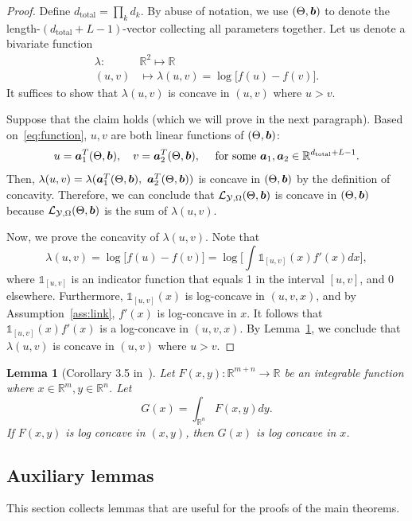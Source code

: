 \documentclass{article}
\theoremstyle{plain}
\newtheorem{lem}{Lemma}
\theoremstyle{definition}
\begin{document}
\begin{proof}
Define $d_{\text{total}}=\prod_k d_k$. By abuse of notation, we use $(\Theta,\bm{b})$ to denote the length-$(d_{\text{total}}+L-1)$-vector collecting all parameters together. Let us denote a bivariate function
\begin{align}
\lambda\colon &\mathbb{R}^2\mapsto \mathbb{R}\\
(u,v)&\mapsto\lambda(u,v) = \log \big[f(u)-  f(v)\big].
\end{align}
It suffices to show that $\lambda(u,v)$ is concave in $(u,v)$ where $u>v$.

Suppose that the claim holds (which we will prove in the next paragraph). Based on~\eqref{eq:function}, $u,v$ are both linear functions of $(\Theta,\bm{b})$:
\[
u = \bm{a}_1^T(\Theta,\bm{b}), \quad v = \bm{a}_2^T(\Theta,\bm{b}), \quad \text{ for some}\ \bm{a}_1,\bm{a}_2\in \mathbb{R}^{d_{\text{total}}+L-1}.
\]
Then, $\lambda(u,v) = \lambda(\ma_1^T(\Theta,\mb),\ \ma_2^T(\Theta,\mb))$ is concave in $(\Theta,\bm{b})$ by the definition of concavity. Therefore, we can conclude that $\mathcal{L}_{\mathcal{Y},\Omega}(\Theta, \bm{b}) $ is concave in $(\Theta,\bm{b})$ because $\mathcal{L}_{\mathcal{Y},\Omega}(\Theta, \bm{b})$ is the sum of $\lambda(u,v)$.

Now, we prove the concavity of $\lambda(u,v)$. Note that
\begin{equation}
\lambda(u,v) = \log\big[f(u)-f(v)\big]=\log\big[\int\mathds{1}_{[u,v]}(x)f'(x)dx\big],
\end{equation}
where $\mathds{1}_{[u,v]}$ is an indicator function that equals 1 in the interval $[u,v]$, and 0 elsewhere. Furthermore, $\mathds{1}_{[u,v]}(x)$ is log-concave in $(u,v,x)$, and by Assumption~\ref{ass:link}, $f'(x)$ is log-concave in $x$. It follows that $\mathds{1}_{[u,v]}(x)f'(x)$
is a log-concave in $(u,v,x)$. By Lemma~\ref{lem:lossconvexity}, we conclude that $\lambda(u,v)$ is concave in $(u,v)$ where $u>v$.
\end{proof}


\begin{lem}[Corollary 3.5 in~\citet{brascamp2002extensions}]\label{lem:lossconvexity}
Let $F(x,y)\colon \mathbb{R}^{m+n}\rightarrow \mathbb{R}$ be an integrable function where $x\in \mathbb{R}^{m},y\in \mathbb{R}^n$. Let
\[
G(x) = \int_{\mathbb{R}^n}F(x,y)dy.
\]
If $F(x,y)$ is log concave in $(x,y)$, then $G(x)$ is log concave in $x$.
\end{lem}


\subsection{Auxiliary lemmas}\label{sec:lemma}
This section collects lemmas that are useful for the proofs of the main theorems.
\end{document}
